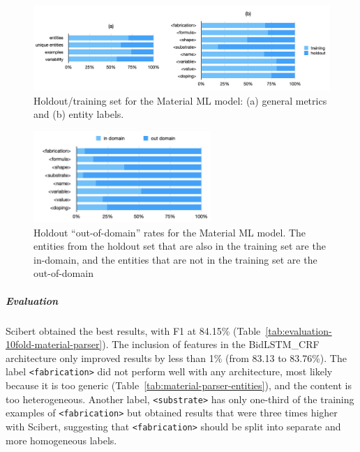 \documentclass[]{interact}
\theoremstyle{plain}%
\theoremstyle{definition}
\theoremstyle{remark}
\begin{document}
\begin{figure}[ht]
    \centering
    \includegraphics[width=\textwidth]{material-holdout-training-set}
    \caption{Holdout/training set for the Material ML model: (a) general metrics and (b) entity labels.}
    \label{fig:material-training-holdout-set-distribution}
\end{figure}

\begin{figure}[ht]
    \centering
    \includegraphics[width=0.6\textwidth]{material-out-domain-holdout-unique}
    \caption{Holdout ``out-of-domain'' rates for the Material ML model. The entities from the holdout set that are also in the training set are the in-domain, and the entities that are not in the training set are the out-of-domain}
    \label{fig:material-out-domain-holdout}
\end{figure}

\subparagraph*{Evaluation}

Scibert obtained the best results, with F1 at 84.15\% (Table~\ref{tab:evaluation-10fold-material-parser}).
The inclusion of features in the BidLSTM\_CRF architecture only improved results by less than 1\% (from 83.13 to 83.76\%).
The label \texttt{<fabrication>} did not perform well with any architecture, most likely because it is too generic (Table~\ref{tab:material-parser-entities}), and the content is too heterogeneous. Another label, \texttt{<substrate>} has only one-third of the training examples of \texttt{<fabrication>} but obtained results that were three times higher with Scibert, suggesting that \texttt{<fabrication>} should be split into separate and more homogeneous labels.
\end{document}
